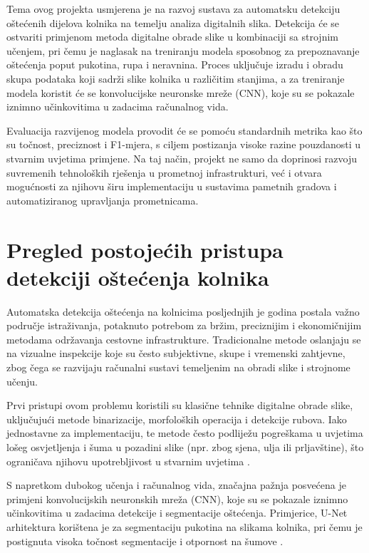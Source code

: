 \documentclass[conference]{IEEEtran}
\begin{document}
Tema ovog projekta usmjerena je na razvoj sustava za automatsku detekciju oštećenih dijelova kolnika na temelju analiza digitalnih slika. Detekcija će se ostvariti primjenom metoda digitalne obrade slike u kombinaciji sa strojnim učenjem, pri čemu je naglasak na treniranju modela sposobnog za prepoznavanje oštećenja poput pukotina, rupa i neravnina. Proces uključuje izradu i obradu skupa podataka koji sadrži slike kolnika u različitim stanjima, a za treniranje modela koristit će se konvolucijske neuronske mreže (CNN), koje su se pokazale iznimno učinkovitima u zadacima računalnog vida.

Evaluacija razvijenog modela provodit će se pomoću standardnih metrika kao što su točnost, preciznost i F1-mjera, s ciljem postizanja visoke razine pouzdanosti u stvarnim uvjetima primjene. Na taj način, projekt ne samo da doprinosi razvoju suvremenih tehnoloških rješenja u prometnoj infrastrukturi, već i otvara mogućnosti za njihovu širu implementaciju u sustavima pametnih gradova i automatiziranog upravljanja prometnicama.

\section{Pregled postojećih pristupa detekciji oštećenja kolnika}
\label{pog:pregled}

Automatska detekcija oštećenja na kolnicima posljednjih je godina postala važno područje istraživanja, potaknuto potrebom za bržim, preciznijim i ekonomičnijim metodama održavanja cestovne infrastrukture. Tradicionalne metode oslanjaju se na vizualne inspekcije koje su često subjektivne, skupe i vremenski zahtjevne, zbog čega se razvijaju računalni sustavi temeljenim na obradi slike i strojnome učenju.

Prvi pristupi ovom problemu koristili su klasične tehnike digitalne obrade slike, uključujući metode binarizacije, morfoloških operacija i detekcije rubova. Iako jednostavne za implementaciju, te metode često podliježu pogreškama u uvjetima lošeg osvjetljenja i šuma u pozadini slike (npr. zbog sjena, ulja ili prljavštine), što ograničava njihovu upotrebljivost u stvarnim uvjetima \cite{lau2020}.

S napretkom dubokog učenja i računalnog vida, značajna pažnja posvećena je primjeni konvolucijskih neuronskih mreža (CNN), koje su se pokazale iznimno učinkovitima u zadacima detekcije i segmentacije oštećenja. Primjerice, U-Net arhitektura korištena je za segmentaciju pukotina na slikama kolnika, pri čemu je postignuta visoka točnost segmentacije i otpornost na šumove \cite{lau2020}.
\end{document}
